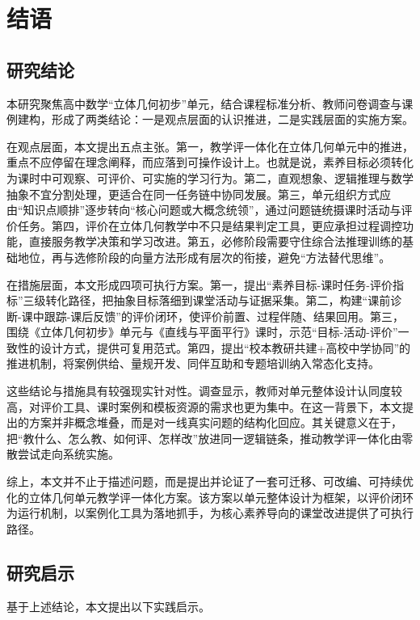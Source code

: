 \documentclass[UTF8,a4paper,12pt,twoside]{ctexart}
\begin{document}
\section{结语}

\subsection{研究结论}

本研究聚焦高中数学“立体几何初步”单元，结合课程标准分析、教师问卷调查与课例建构，形成了两类结论：一是观点层面的认识推进，二是实践层面的实施方案。

在观点层面，本文提出五点主张。第一，教学评一体化在立体几何单元中的推进，重点不应停留在理念阐释，而应落到可操作设计上。也就是说，素养目标必须转化为课时中可观察、可评价、可实施的学习行为。第二，直观想象、逻辑推理与数学抽象不宜分割处理，更适合在同一任务链中协同发展。第三，单元组织方式应由“知识点顺排”逐步转向“核心问题或大概念统领”，通过问题链统摄课时活动与评价任务。第四，评价在立体几何教学中不只是结果判定工具，更应承担过程调控功能，直接服务教学决策和学习改进。第五，必修阶段需要守住综合法推理训练的基础地位，再与选修阶段的向量方法形成有层次的衔接，避免“方法替代思维”。

在措施层面，本文形成四项可执行方案。第一，提出“素养目标-课时任务-评价指标”三级转化路径，把抽象目标落细到课堂活动与证据采集。第二，构建“课前诊断-课中跟踪-课后反馈”的评价闭环，使评价前置、过程伴随、结果回用。第三，围绕《立体几何初步》单元与《直线与平面平行》课时，示范“目标-活动-评价”一致性的设计方式，提供可复用范式。第四，提出“校本教研共建+高校中学协同”的推进机制，将案例供给、量规开发、同伴互助和专题培训纳入常态化支持。

这些结论与措施具有较强现实针对性。调查显示，教师对单元整体设计认同度较高，对评价工具、课时案例和模板资源的需求也更为集中。在这一背景下，本文提出的方案并非概念堆叠，而是对一线真实问题的结构化回应。其关键意义在于，把“教什么、怎么教、如何评、怎样改”放进同一逻辑链条，推动教学评一体化由零散尝试走向系统实施。

综上，本文并不止于描述问题，而是提出并论证了一套可迁移、可改编、可持续优化的立体几何单元教学评一体化方案。该方案以单元整体设计为框架，以评价闭环为运行机制，以案例化工具为落地抓手，为核心素养导向的课堂改进提供了可执行路径。

\subsection{研究启示}

基于上述结论，本文提出以下实践启示。
\end{document}
